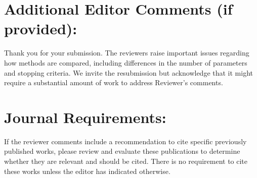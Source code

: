 \documentclass[a4paper, 11pt]{article}
\begin{document}
\section*{Additional Editor Comments (if provided):}

Thank you for your submission. The reviewers raise important issues regarding how methods are compared, including differences in the number of parameters and stopping criteria. We invite the resubmission but acknowledge that it might require a substantial amount of work to address Reviewer's comments.

\section*{Journal Requirements:}

If the reviewer comments include a recommendation to cite specific previously published works, please review and evaluate these publications to determine whether they are relevant and should be cited. There is no requirement to cite these works unless the editor has indicated otherwise.
\end{document}
